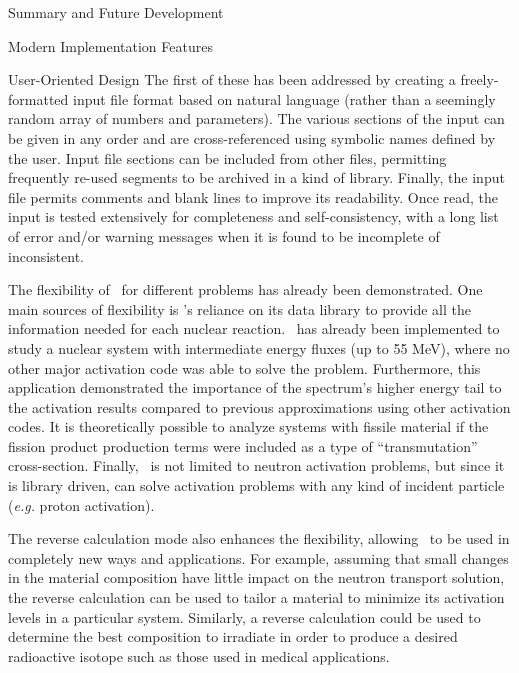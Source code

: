\begin{chapter}{Summary and Future Development}
\begin{section}{Modern Implementation Features\label{sec:summary.modern}}
\begin{subsection}{User-Oriented Design}
      The first of these has been addressed by creating a
      freely-formatted input file format based on natural language
      (rather than a seemingly random array of numbers and
      parameters).  The various sections of the input can be given in
      any order and are cross-referenced using symbolic names defined
      by the user.  Input file sections can be included from other
      files, permitting frequently re-used segments to be archived in
      a kind of library.  Finally, the input file permits comments and
      blank lines to improve its readability.  Once read, the input is
      tested extensively for completeness and self-consistency, with a
      long list of error and/or warning messages when it is found to
      be incomplete of inconsistent.
      
      The flexibility of \ALARA\  for different problems has already
      been demonstrated.  One main sources of flexibility is \ALARA's
      reliance on its data library to provide all the information
      needed for each nuclear reaction.  \ALARA\  has already been
      implemented to study a nuclear system with intermediate energy
      fluxes (up to 55 MeV)\cite{UKA.Thesis}, where no other major
      activation code was able to solve the problem.  Furthermore,
      this application demonstrated the importance of the spectrum's
      higher energy tail to the activation results compared to
      previous approximations using other activation codes.  It is
      theoretically possible to analyze systems with fissile material
      if the fission product production terms were included as a type
      of ``transmutation'' cross-section.  Finally, \ALARA\  is not
      limited to neutron activation problems, but since it is library
      driven, can solve activation problems with any kind of incident
      particle (\textsl{e.g.} proton activation).
      
      The reverse calculation mode also enhances the flexibility,
      allowing \ALARA\  to be used in completely new ways and
      applications.  For example, assuming that small changes in the
      material composition have little impact on the neutron transport
      solution, the reverse calculation can be used to tailor a
      material to minimize its activation levels in a particular
      system.  Similarly, a reverse calculation could be used to
      determine the best composition to irradiate in order to produce
      a desired radioactive isotope such as those used in medical
      applications.
    \end{subsection}


\end{section}
\end{chapter}
